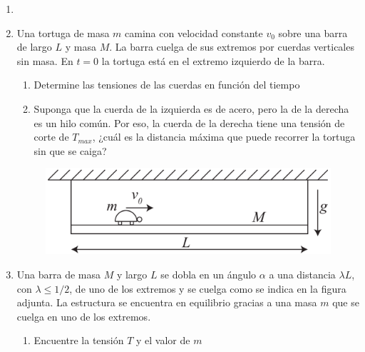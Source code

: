 \documentclass[letterpaper,11pt]{article}
\begin{document}
\vspace{-1cm}
\begin{enumerate}\setlength{\itemsep}{0.4cm}


\item[]

\item Una tortuga de masa $m$ camina con velocidad constante $v_0$ sobre una barra de largo $L$ y masa $M$. La barra cuelga de sus extremos por cuerdas verticales sin masa. En $t=0$ la tortuga está en el extremo izquierdo de la barra.

\begin{multicols}{2}
    
    \begin{enumerate}
        \item Determine las tensiones de las cuerdas en función del tiempo
        
        \item Suponga que la cuerda de la izquierda es de acero, pero la de la derecha es un hilo común. Por eso, la cuerda de la derecha tiene una tensión de corte de $T_{max}$, ¿cuál es la distancia máxima que puede recorrer la tortuga sin que se caiga?
    \end{enumerate}
    
    \columnbreak
    
    \begin{figure}[H]
        \centering
        \includegraphics[width=0.9\linewidth]{2021-2/img/aux12/aux12-tortuga.PNG}
    \end{figure}
\end{multicols}

\item 
\begin{multicols}{2} Una barra de masa $M$ y largo $L$ se dobla en un ángulo $\alpha$ a una distancia $\lambda L$, con $\lambda \leq 1/2$, de uno de los extremos y se cuelga como se indica en la figura adjunta. La estructura se encuentra en equilibrio gracias a una masa $m$ que se cuelga en uno de los extremos.
    \begin{enumerate}
        \item Encuentre la tensión $T$ y el valor de $m$
        

\end{enumerate}
\end{multicols}
\end{enumerate}
\end{document}
